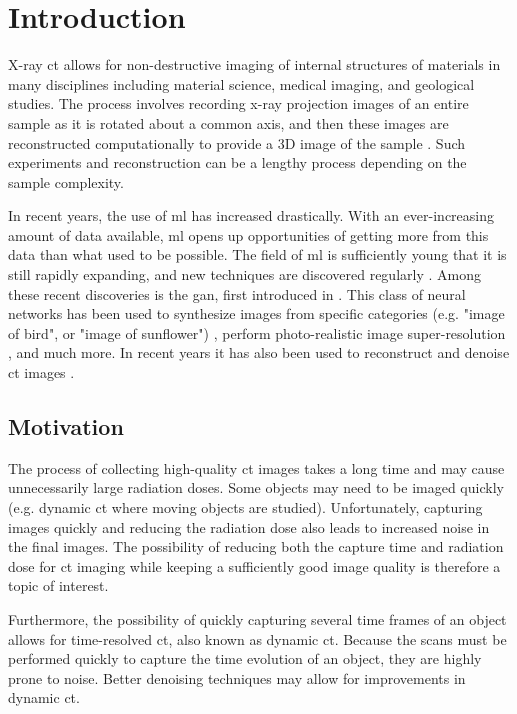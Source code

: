 \chapter{Introduction}
\label{sec:introduction}
X-ray \gls{ct} allows for non-destructive imaging of internal structures of materials in many disciplines including material science, medical imaging, and geological studies. The process involves recording x-ray projection images of an entire sample as it is rotated about a common axis, and then these images are reconstructed computationally to provide a 3D image of the sample \cite{KakSlaney98}. Such experiments and reconstruction can be a lengthy process depending on the sample complexity. 

In recent years, the use of \gls{ml} has increased drastically. With an ever-increasing amount of data available, \gls{ml} opens up opportunities of getting more from this data than what used to be possible. The field of \gls{ml} is sufficiently young that it is still rapidly expanding, and new techniques are discovered regularly \cite{Jordan255}. Among these recent discoveries is the \gls{gan}, first introduced in \citeyear{goodfellow2014gan} \cite{goodfellow2014gan}. This class of neural networks has been used to synthesize images from specific categories (e.g. "image of bird", or "image of sunflower") \cite{Bao_2017_ICCV}, perform photo-realistic image super-resolution \cite{Ledig_2017_CVPR}, and much more. In recent years it has also been used to reconstruct and denoise \gls{ct} images \cite{GANrec,liu2020tomogan}. 

\section{Motivation}
The process of collecting high-quality \gls{ct} images takes a long time and may cause unnecessarily large radiation doses. Some objects may need to be imaged quickly (e.g. dynamic \gls{ct} where moving objects are studied). Unfortunately, capturing images quickly and reducing the radiation dose also leads to increased noise in the final images. The possibility of reducing both the capture time and radiation dose for \gls{ct} imaging while keeping a sufficiently good image quality is therefore a topic of interest. 

Furthermore, the possibility of quickly capturing several time frames of an object allows for time-resolved \gls{ct}, also known as dynamic \gls{ct}. Because the scans must be performed quickly to capture the time evolution of an object, they are highly prone to noise. Better denoising techniques may allow for improvements in dynamic \gls{ct}. 


